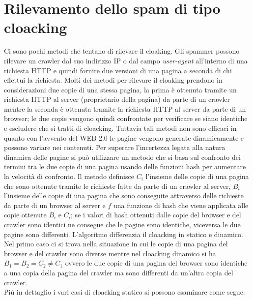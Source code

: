 \section{Rilevamento dello spam di tipo cloacking}
Ci sono pochi metodi che tentano di rilevare il cloaking. Gli spammer possono rilevare un crawler dal suo indirizzo IP o dal campo \textit{user-agent} all'interno di una richiesta HTTP e quindi fornire due versioni di una pagina a seconda di chi effettui la richiesta. Molti dei metodi per rilevare il cloaking prendono in considerazioni due copie di una stessa pagina, la prima è ottenuta tramite un richiesta HTTP al server (proprietario della pagina) da parte di un crawler mentre la seconda è ottenuta tramite la richiesta HTTP al server da parte di un browser; le due copie vengono quindi confrontate per verificare se siano identiche e escludere che si tratti di cloacking. Tuttavia tali metodi non sono efficaci in quanto con l'avvento del WEB 2.0 le pagine vengono generate dinamicamente e possono variare nei contenuti. Per superare l'incertezza legata alla natura dinamica delle pagine si può utilizzare un metodo \cite{Ghiam:2013cloaking} che si basa sul confronto dei termini tra le due copie di una pagina 
usando delle funzioni hash per aumentare la velocità di confronto. Il metodo definisce  \(C_i\) l'insieme delle copie di una pagina che sono ottenute tramite le richieste fatte da parte di un crawler al server, \(B_i\) l'insieme delle copie di una pagina che sono conseguite attraverso delle richieste da parte di un browser al server e \(f\) una funzione di hash che viene applicata alle copie ottenute \(B_i\) e \(C_i\); se i valori di hash ottenuti dalle copie del browser e del crawler  sono identici  ne consegue che  le pagine sono identiche, viceversa le due pagine sono differenti. L'algoritmo differenzia il cloacking in statico e dinamico. Nel primo caso ci si trova nella situazione in cui le copie di una pagina del browser e del crawler sono diverse mentre nel cloacking dinamico si ha \(B_1=B_2=C_2 \not =C_1\) ovvero le due copie di una pagina del browser sono identiche a una copia della pagina del crawler ma sono differenti da un'altra copia del crawler. \\
Più in dettaglio i vari casi di cloacking statico si possono esaminare come segue:
